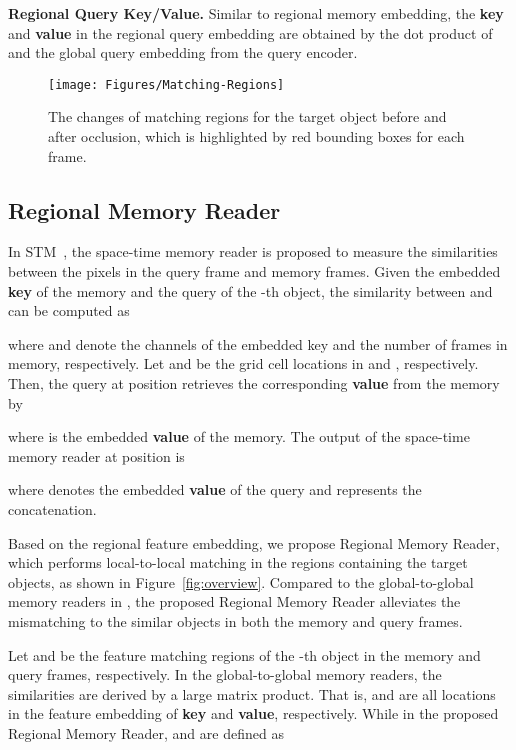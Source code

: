 \documentclass[final]{cvpr}
\begin{document}
\noindent \textbf{Regional Query Key/Value.}
Similar to regional memory embedding, the \textbf{key}  and \textbf{value}  in the regional query embedding are obtained by the dot product of  and the global query embedding from the query encoder.

\begin{figure}
  \resizebox{\linewidth}{!} {
    \texttt{[image: Figures/Matching-Regions]}
  }
  \caption{The changes of matching regions for the target object before and after occlusion, which is highlighted by red bounding boxes for each frame.}
  \label{fig:matching-regions}
  \vspace{-2 mm}
\end{figure}

\subsection{Regional Memory Reader}

In STM~\cite{DBLP:conf/iccv/OhLXK19}, the space-time memory reader is proposed to measure the similarities between the pixels in the query frame and memory frames.
Given the embedded \textbf{key} of the memory  and the query  of the -th object, the similarity between  and  can be computed as 


where  and  denote the channels of the embedded key and the number of frames in memory, respectively.
Let  and  be the grid cell locations in  and , respectively.
Then, the query at position  retrieves the corresponding \textbf{value} from the memory by


where  is the embedded \textbf{value} of the memory.
The output of the space-time memory reader at position  is


where  denotes the embedded \textbf{value} of the query and  represents the concatenation.

Based on the regional feature embedding, we propose Regional Memory Reader, which performs local-to-local matching in the regions containing the target objects, as shown in Figure~\ref{fig:overview}.
Compared to the global-to-global memory readers in \cite{DBLP:conf/eccv/LuWDZSG20,DBLP:conf/cvpr/OhLXK19,DBLP:conf/eccv/SeongHK20}, the proposed Regional Memory Reader alleviates the mismatching  to the similar objects in both the memory and query frames.

Let  and  be the feature matching regions of the -th object in the memory and query frames, respectively.
In the global-to-global memory readers, the similarities are derived by a large matrix product.
That is,  and  are all locations in the feature embedding of \textbf{key} and \textbf{value}, respectively.
While in the proposed Regional Memory Reader,  and  are defined as
\end{document}
